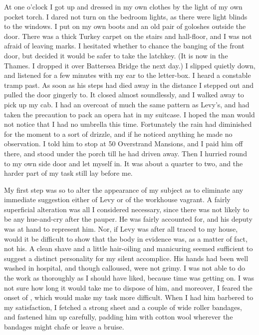 At one o'clock I got up and dressed in my own clothes by the light of my own pocket torch. I dared not turn on the bedroom lights, as there were light blinds to the windows. I put on my own boots and an old pair of goloshes outside the door. There was a thick Turkey carpet on the stairs and hall-floor, and I was not afraid of leaving marks. I hesitated whether to chance the banging of the front door, but decided it would be safer to take the latchkey. (It is now in the Thames. I dropped it over Battersea Bridge the next day.) I slipped quietly down, and listened for a few minutes with my ear to the letter-box. I heard a constable tramp past. As soon as his steps had died away in the distance I stepped out and pulled the door gingerly to. It closed almost soundlessly, and I walked away to pick up my cab. I had an overcoat of much the same pattern as Levy's, and had taken the precaution to pack an opera hat in my suitcase. I hoped the man would not notice that I had no umbrella this time. Fortunately the rain had diminished for the moment to a sort of drizzle, and if he noticed anything he made no observation. I told him to stop at 50 Overstrand Mansions, and I paid him off there, and stood under the porch till he had driven away. Then I hurried round to my own side door and let myself in. It was about a quarter to two, and the harder part of my task still lay before me.

My first step was so to alter the appearance of my subject as to eliminate any immediate suggestion either of Levy or of the workhouse vagrant. A fairly superficial alteration was all I considered necessary, since there was not likely to be any hue-and-cry after the pauper. He was fairly accounted for, and his deputy was at hand to represent him. Nor, if Levy was after all traced to my house, would it be difficult to show that the body in evidence was, as a matter of fact, not his. A clean shave and a little hair-oiling and manicuring seemed sufficient to suggest a distinct personality for my silent accomplice. His hands had been well washed in hospital, and though calloused, were not grimy. I was not able to do the work as thoroughly as I should have liked, because time was getting on. I was not sure how long it would take me to dispose of him, and moreover, I feared the onset of , which would make my task more difficult. When I had him barbered to my satisfaction, I fetched a strong sheet and a couple of wide roller bandages, and fastened him up carefully, padding him with cotton wool wherever the bandages might chafe or leave a bruise.

